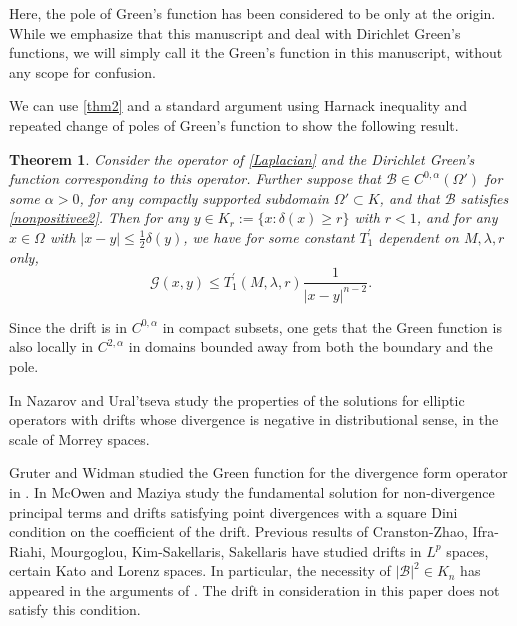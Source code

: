 \documentclass{article}
\theoremstyle{plain}
\newtheorem{theorem}{Theorem}
\theoremstyle{definition}
\theoremstyle{plain}
\newcommand{\B}{\mathcal{B}}
\newcommand{\G}{\mathcal{G}}
\begin{document}
Here, the pole of Green's function has been considered to be only at the origin. While we emphasize that this manuscript and \cite{Pat25} deal with Dirichlet Green's functions, we will simply call it the Green's function in this manuscript, without any scope for confusion.


We can use \cref{thm2} and a standard argument using Harnack inequality and repeated change of poles of Green's function to show the following result.
\begin{theorem}\label{thm3}
    Consider the operator of \cref{Laplacian} and the Dirichlet Green's function corresponding to this operator. Further suppose that $\B\in C^{0,\alpha}(\Omega')$ for some $\alpha>0$, for any compactly supported subdomain $\Omega'\subset K$, and that $\B$ satisfies  \cref{nonpositivee2}.  Then for any $y\in K_r:=\{x:\delta(x)\geq r\}$ with $r<1$, and for any $x\in \Omega$ with $|x-y|\leq \frac{1}{2}\delta(y)$, we have for some constant $T_{1}^{'}$ dependent on $M, \lambda,r$ only,
    \begin{equation}
        \G(x,y)\leq T_{1}^{'}(M,\lambda,r)\frac{1}{|x-y|^{n-2}}.
    \end{equation}
\end{theorem}

Since the drift is in $C^{0,\alpha}$ in compact subsets, one gets that the Green function is also locally in $C^{2,\alpha}$ in domains bounded away from both the boundary and the pole.


In \cite{Naz12} Nazarov and Ural’tseva study the properties of the solutions for elliptic operators with  drifts whose divergence is negative in distributional sense, in the scale of Morrey spaces.

Gruter and Widman studied the Green function for the divergence form operator in \cite{GrWi}. In \cite{MM22} McOwen and Maziya study the fundamental solution for non-divergence principal terms and drifts satisfying point divergences with a square Dini condition on the coefficient of the drift. Previous results of Cranston-Zhao, Ifra-Riahi, Mourgoglou, Kim-Sakellaris, Sakellaris \cite{An86, CrZh87,IfLo05,Singdr,KimSa,Morg,Sake} have studied drifts in $L^p$ spaces, certain Kato and Lorenz spaces. In particular, the necessity of $|\B|^2\in K_{n}$ has appeared in the arguments of \cite{CrZh87, IfLo05,Morg}. The drift in consideration in this paper does not satisfy this condition.
\end{document}
